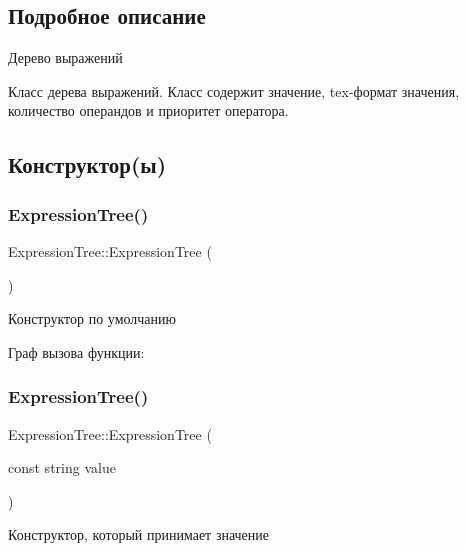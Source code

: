 \subsection{Подробное описание}
Дерево выражений 

Класс дерева выражений. Класс содержит значение, tex-\/формат значения, количество операндов и приоритет оператора. 

\subsection{Конструктор(ы)}
\mbox{\label{class_expression_tree_a0d743ee804cf5d9c792906f936151886}} 
\subsubsection{\texorpdfstring{Expression\+Tree()}{ExpressionTree()}\hspace{0.1cm}{\footnotesize\ttfamily [1/2]}}
{\footnotesize\ttfamily Expression\+Tree\+::\+Expression\+Tree (\begin{DoxyParamCaption}{ }\end{DoxyParamCaption})}



Конструктор по умолчанию 

Граф вызова функции\+:
\mbox{\label{class_expression_tree_aa158e3eced2b61eedabec90ff8f62a3b}} 
\subsubsection{\texorpdfstring{Expression\+Tree()}{ExpressionTree()}\hspace{0.1cm}{\footnotesize\ttfamily [2/2]}}
{\footnotesize\ttfamily Expression\+Tree\+::\+Expression\+Tree (\begin{DoxyParamCaption}\item[{const string}]{value }\end{DoxyParamCaption})}



Конструктор, который принимает значение 



